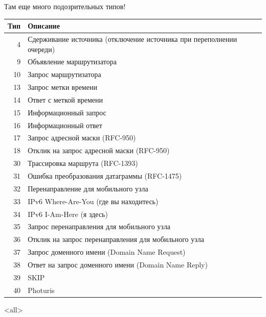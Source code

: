 \begin{frame}{Там еще много подозрительных типов!}
	\scriptsize
	\begin{table}[ht]
	\centering
	\begin{tabular}[c]{r|l}
Тип & Описание \\
	\hline
4 & Сдерживание источника (отключение источника при переполнении очереди)\\
9 & Объявление маршрутизатора\\
10 & Запрос маршрутизатора\\
13 & Запрос метки времени\\
14 & Ответ с меткой времени\\
15 & Информационный запрос\\
16 & Информационный ответ\\
17 & Запрос адресной маски (RFC-950)\\
18 & Отклик на запрос адресной маски (RFC-950)\\
30 & Трассировка маршрута (RFC-1393)\\
31 & Ошибка преобразования датаграммы (RFC-1475)\\
32 & Перенаправление для мобильного узла\\
33 & IPv6 Where-Are-You (где вы находитесь)\\
34 & IPv6 I-Am-Here (я здесь)\\
35 & Запрос перенаправления для мобильного узла\\
36 & Отклик на запрос перенаправления для мобильного узла\\
37 & Запрос доменного имени (Domain Name Request)\\
38 & Ответ на запрос доменного имени (Domain Name Reply)\\
39 & SKIP\\
40 & Photuris\\
	\end{tabular}
	\end{table}
	\normalsize
\end{frame}

\mode<all>{}


